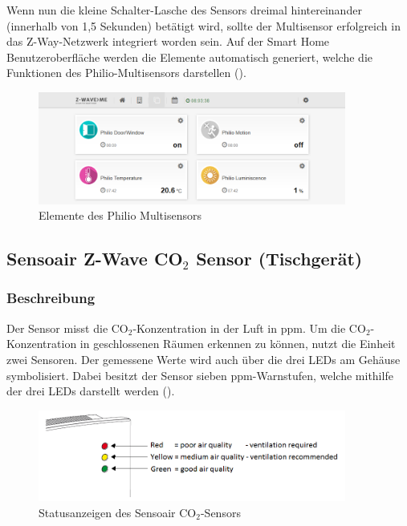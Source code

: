 Wenn nun die kleine Schalter-Lasche des Sensors dreimal hintereinander (innerhalb von 1,5 Sekunden) betätigt wird, sollte der Multisensor erfolgreich in das Z-Way-Netzwerk integriert worden sein. Auf der Smart Home Benutzeroberfläche werden die Elemente automatisch generiert, welche die Funktionen des Philio-Multisensors darstellen ().

\begin{figure}[h!]
	\centering
	\includegraphics[width=0.9\textwidth]{img/Sensorevaluation/PhilioElements.png}
	\caption{Elemente des Philio Multisensors}
	\label{fig:sensorenPhilioElements}
\end{figure}

\subsection{Sensoair Z-Wave CO$_2$ Sensor (Tischgerät)}

\subsubsection{Beschreibung}
Der Sensor misst die CO$_2$-Konzentration in der Luft in \gls{ppm}. Um die CO$_2$-Konzentration in geschlossenen Räumen erkennen zu können, nutzt die Einheit zwei Sensoren. Der gemessene Werte wird auch über die drei LEDs am Gehäuse symbolisiert. Dabei besitzt der Sensor sieben \gls{ppm}-Warnstufen, welche mithilfe der drei LEDs darstellt werden ().

\begin{figure}[h!]
	\centering
	\includegraphics[width=0.9\textwidth]{img/Sensorevaluation/Sensoair.png}
	\caption{Statusanzeigen des Sensoair CO$_2$-Sensors}
	\label{fig:sensorenSensoair}
\end{figure}


